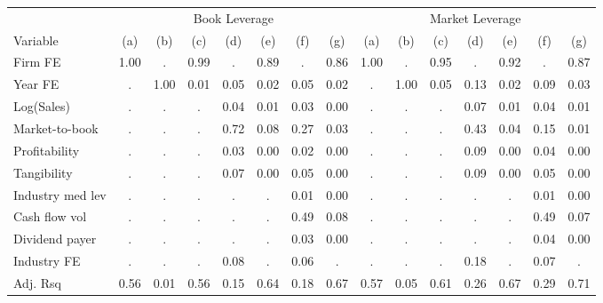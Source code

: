 \begin{tabular}{l c c c c c c c c c c c c c c}
\toprule
& \multicolumn{7}{c}{Book Leverage} & \multicolumn{7}{c}{Market Leverage} \\
\cmidrule(lr){2-8} \cmidrule(lr){9-15}
Variable & (a) & (b) & (c) & (d) & (e) & (f) & (g) & (a) & (b) & (c) & (d) & (e) & (f) & (g) \\
\midrule
Firm FE&1.00&.&0.99&.&0.89&.&0.86&1.00&.&0.95&.&0.92&.&0.87\\
Year FE&.&1.00&0.01&0.05&0.02&0.05&0.02&.&1.00&0.05&0.13&0.02&0.09&0.03\\
Log(Sales)&.&.&.&0.04&0.01&0.03&0.00&.&.&.&0.07&0.01&0.04&0.01\\
Market-to-book&.&.&.&0.72&0.08&0.27&0.03&.&.&.&0.43&0.04&0.15&0.01\\
Profitability&.&.&.&0.03&0.00&0.02&0.00&.&.&.&0.09&0.00&0.04&0.00\\
Tangibility&.&.&.&0.07&0.00&0.05&0.00&.&.&.&0.09&0.00&0.05&0.00\\
Industry med lev&.&.&.&.&.&0.01&0.00&.&.&.&.&.&0.01&0.00\\
Cash flow vol&.&.&.&.&.&0.49&0.08&.&.&.&.&.&0.49&0.07\\
Dividend payer&.&.&.&.&.&0.03&0.00&.&.&.&.&.&0.04&0.00\\
Industry FE&.&.&.&0.08&.&0.06&.&.&.&.&0.18&.&0.07&.\\
Adj. Rsq&0.56&0.01&0.56&0.15&0.64&0.18&0.67&0.57&0.05&0.61&0.26&0.67&0.29&0.71\\
\bottomrule
\end{tabular}

